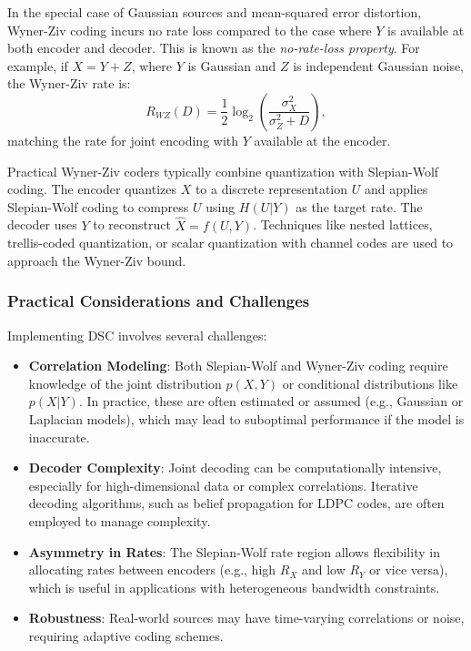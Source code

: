 In the special case of Gaussian sources and mean-squared error distortion, Wyner-Ziv coding incurs no rate loss compared to the case where $Y$ is available at both encoder and decoder. This is known as the \emph{no-rate-loss property}. For example, if $X = Y + Z$, where $Y$ is Gaussian and $Z$ is independent Gaussian noise, the Wyner-Ziv rate is:
\begin{equation}
    R_{WZ}(D) = \frac{1}{2} \log_2 \left( \frac{\sigma_X^2}{\sigma_Z^2 + D} \right),
\end{equation}
matching the rate for joint encoding with $Y$ available at the encoder.

Practical Wyner-Ziv coders typically combine quantization with Slepian-Wolf coding. The encoder quantizes $X$ to a discrete representation $U$ and applies Slepian-Wolf coding to compress $U$ using $H(U|Y)$ as the target rate. The decoder uses $Y$ to reconstruct $\hat{X} = f(U,Y)$. Techniques like nested lattices, trellis-coded quantization, or scalar quantization with channel codes are used to approach the Wyner-Ziv bound.

\subsubsection{Practical Considerations and Challenges}

Implementing DSC involves several challenges:

\begin{itemize}
    \item \textbf{Correlation Modeling}: Both Slepian-Wolf and Wyner-Ziv coding require knowledge of the joint distribution $p(X,Y)$ or conditional distributions like $p(X|Y)$. In practice, these are often estimated or assumed (e.g., Gaussian or Laplacian models), which may lead to suboptimal performance if the model is inaccurate.
    \item \textbf{Decoder Complexity}: Joint decoding can be computationally intensive, especially for high-dimensional data or complex correlations. Iterative decoding algorithms, such as belief propagation for LDPC codes, are often employed to manage complexity.
    \item \textbf{Asymmetry in Rates}: The Slepian-Wolf rate region allows flexibility in allocating rates between encoders (e.g., high $R_X$ and low $R_Y$ or vice versa), which is useful in applications with heterogeneous bandwidth constraints.
    \item \textbf{Robustness}: Real-world sources may have time-varying correlations or noise, requiring adaptive coding schemes.
\end{itemize}

